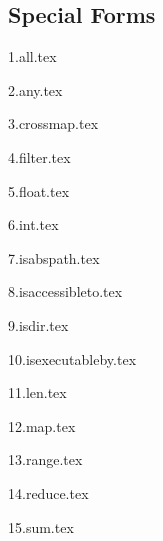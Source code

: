
\subsection{Special Forms}
{
	\lipsum[1]
	
	{1.all.tex}
	
	{2.any.tex}
	
	{3.crossmap.tex}
	
	{4.filter.tex}
	
	{5.float.tex}
	
	{6.int.tex}
	
	{7.isabspath.tex}
	
	{8.isaccessibleto.tex}
	
	{9.isdir.tex}
	
	{10.isexecutableby.tex}
	
	{11.len.tex}
	
	{12.map.tex}
	
	{13.range.tex}
	
	{14.reduce.tex}
	
	{15.sum.tex}
}

